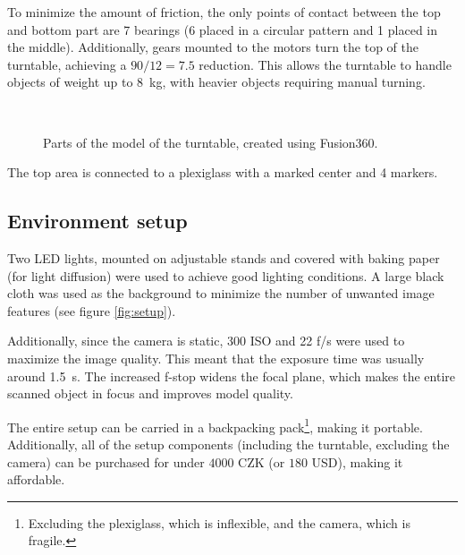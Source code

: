 To minimize the amount of friction, the only points of contact between the top and bottom part are 7 bearings (6 placed in a circular pattern and 1 placed in the middle).
Additionally, gears mounted to the motors turn the top of the turntable, achieving a $90/12 = 7.5$ reduction.
This allows the turntable to handle objects of weight up to \SI{8}{\kilo\gram}, with heavier objects requiring manual turning.

\begin{figure}
	\centering
	\hfill
	\hfill
	\\
	\qquad
	\qquad
	\hfill
	\hfill
	\qquad
	\qquad
	\quad
	\qquad
	\caption{Parts of the model of the turntable, created using Fusion360.}%
	\label{fig:turntable}
\end{figure}

The top area is connected to a plexiglass with a marked center and 4 markers.

\subsection{Environment setup}
Two LED lights, mounted on adjustable stands and covered with baking paper (for light diffusion) were used to achieve good lighting conditions.
A large black cloth was used as the background to minimize the number of unwanted image features (see figure \ref{fig:setup}).

Additionally, since the camera is static, 300 ISO and 22 f/s were used to maximize the image quality.
This meant that the exposure time was usually around \SI{1.5}{\second}.
The increased f-stop widens the focal plane, which makes the entire scanned object in focus and improves model quality.

The entire setup can be carried in a backpacking pack\footnote{Excluding the plexiglass, which is inflexible, and the camera, which is fragile.}, making it portable.
Additionally, all of the setup components (including the turntable, excluding the camera) can be purchased for under $4000$ CZK (or $180$ USD), making it affordable.

